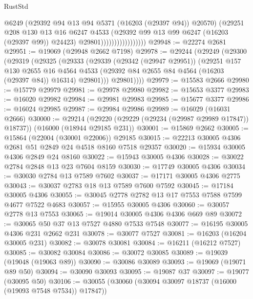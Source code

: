 \begin{lexlean}{RustStd}
\begin{coremodule}
                                    @6249
                                    (@29392 @94 @13 @94 @5371 (@16203 (@29397 @94)) @20570)
                                    (@29251
                                      @208
                                      @130
                                      @13
                                      @16
                                      @6247
                                      @4533
                                      (@29392 @99 @13 @99 @6247 (@16203 (@29397 @99)) @24423)
                                      @29801)))))))))))))))))
@29948 := @22274 @2681
@29951 := @19069 (@29948 @2662 @7198)
@29978 := @29244
    (@29249
      (@29300
        (@29319
          (@29325
            (@29333
              (@29339
                (@29342 (@29947 @29951))
                (@29251
                  @157
                  @130
                  @2655
                  @16
                  @4564
                  @4533
                  (@29392 @84 @2655 @84 @4564 (@16203 (@29397 @84)) @16314)
                  @29801)))
            @29801))))
@29979 := @15583 @2666
@29980 := @15779 @29979
@29981 := @29978 @29980
@29982 := @15653 @3377
@29983 := @16020 @29982
@29984 := @29981 @29983
@29985 := @15677 @3377
@29986 := @16024 @29985
@29987 := @29984 @29986
@29989 := @16029 (@16031 @2666)
@30000 := @29214
    (@29220 (@29229 (@29234 (@29987 @29989 @17847)) @18737))
    (@16000 (@18944 @29185 @231))
@30001 := @15869 @2662
@30005 := @15864 (@22004 (@30001 @22006)) @29185
@30015 := @22213 @30005 @4306 @2681 @51 @2849 @24 @4518 @8160 @7518 @29357
@30020 := @15934 @30005 @4306 @2849 @24 @8160
@30022 := @15943 @30005 @4306
@30028 := @30022 @2784 @2848 @13 @23 @7604 @8159
@30030 := @17749 @30005 @4306
@30034 := @30030 @2784 @13 @7589 @7602
@30037 := @17171 @30005 @4306 @2775
@30043 := @30037 @2783 @18 @13 @7589 @7600 @7592
@30045 := @17184 @30005 @4306
@30055 := @30045 @2778 @2782 @13 @17 @7553 @7588 @7599 @4677 @7522 @4683
@30057 := @15955 @30005 @4306
@30060 := @30057 @2778 @13 @7553
@30065 := @19014 @30005 @4306 @4306 @669 @89
@30072 := @30065 @50 @37 @13 @7527 @4880 @7533 @7548
@30077 := @16195 @30005 @4306 @231 @2662 @231
@30078 := @30077 @7527
@30081 := @16203 (@16204 @30005 @231)
@30082 := @30078 @30081
@30084 := @16211 (@16212 @7527)
@30085 := @30082 @30084
@30086 := @30072 @30085
@30089 := @19039 (@19048 (@19063 @89))
@30090 := @30086 @30089
@30093 := @19069 (@19071 @89 @50)
@30094 := @30090 @30093
@30095 := @19087 @37
@30097 := @19077 (@30095 @50)
@30106 := @30055 (@30060 (@30094 @30097 @18737 (@16000 (@19093 @7548 @7534)) @17847))

\end{coremodule}
\end{lexlean}
